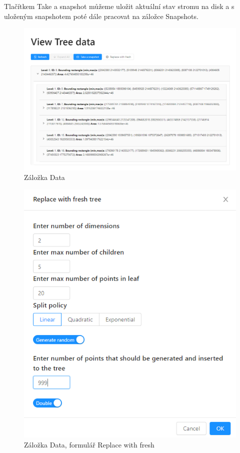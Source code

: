 \documentclass[a4paper,10pt]{article}
\begin{document}
Tlačítkem Take a snapshot můžeme uložit aktuální stav stromu na disk a s uloženým snapshotem poté dále pracovat na záložce Snapshots.
\begin{figure}
    \includegraphics[width=\textwidth]{Data.png}
    \caption{Záložka Data}
    \label{fig:data}
\end{figure}

\begin{figure}
    \centering
    \includegraphics[width=.75\textwidth]{Replace.png}
    \caption{Záložka Data, formulář Replace with fresh}
    \label{fig:replace}
\end{figure}
\end{document}
